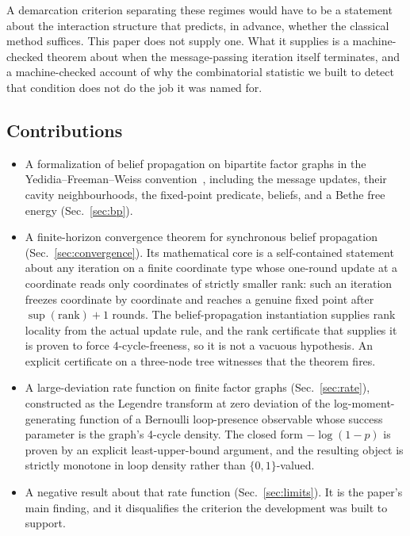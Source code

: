 \documentclass[aps,prx,reprint,nofootinbib,floatfix]{revtex4-2}
\begin{document}
A demarcation criterion separating these regimes would have to be a statement
about the interaction structure that predicts, in advance, whether the classical
method suffices. This paper does not supply one. What it supplies is a
machine-checked theorem about when the message-passing iteration itself
terminates, and a machine-checked account of why the combinatorial statistic we
built to detect that condition does not do the job it was named for.

\subsection{Contributions}

\begin{itemize}
\item A formalization of belief propagation on bipartite factor graphs in the
Yedidia--Freeman--Weiss convention~\cite{YedidiaFreemanWeiss2003}, including
the message updates, their cavity neighbourhoods, the fixed-point predicate,
beliefs, and a Bethe free energy (Sec.~\ref{sec:bp}).

\item A finite-horizon convergence theorem for synchronous belief propagation
(Sec.~\ref{sec:convergence}). Its mathematical core is a self-contained
statement about any iteration on a finite coordinate type whose one-round
update at a coordinate reads only coordinates of strictly smaller rank: such an
iteration freezes coordinate by coordinate and reaches a genuine fixed point
after $\sup(\mathrm{rank})+1$ rounds. The belief-propagation instantiation
supplies rank locality from the actual update rule, and the rank certificate
that supplies it is proven to force 4-cycle-freeness, so it is not a vacuous
hypothesis. An explicit certificate on a three-node tree witnesses that the
theorem fires.

\item A large-deviation rate function on finite factor graphs
(Sec.~\ref{sec:rate}), constructed as the Legendre transform at zero deviation
of the log-moment-generating function of a Bernoulli loop-presence observable
whose success parameter is the graph's 4-cycle density. The closed form
$-\log(1-p)$ is proven by an explicit least-upper-bound argument, and the
resulting object is strictly monotone in loop density rather than
$\{0,1\}$-valued.

\item A negative result about that rate function (Sec.~\ref{sec:limits}). It is
the paper's main finding, and it disqualifies the criterion the development was
built to support.
\end{itemize}
\end{document}
